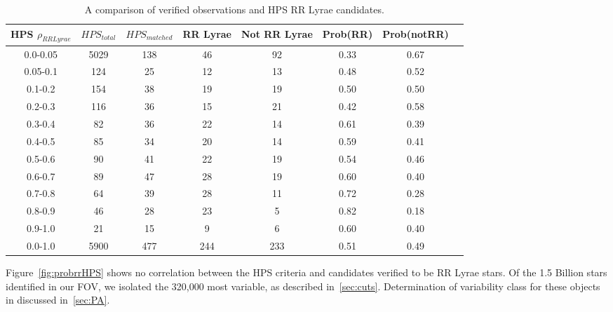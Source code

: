 \documentclass[aps,prb,twocolumn,superscriptaddress]{revtex4-1}
\begin{document}
\begin{table}
	\begin{center}
		\begin{tabular}{|c|c|c|c|c|c|c|c|}\hline
HPS $\rho_{RRLyrae}$ & $HPS_{total}$ & $HPS_{matched}$ & RR Lyrae & Not RR Lyrae & Prob(RR) & Prob(notRR) \\ \hline
0.0-0.05 & 5029 & 138 & 46 		& 92 & 0.33 & 0.67 \\ \hline
0.05-0.1 & 124 & 25 & 12 		& 13 & 0.48 & 0.52 \\ \hline
0.1-0.2 & 154 & 38 & 19 		& 19 & 0.50 & 0.50 \\ \hline
0.2-0.3 & 116 & 36 & 15 		& 21 & 0.42 & 0.58 \\ \hline
0.3-0.4 & 82 & 36 & 22 			& 14 & 0.61 & 0.39 \\ \hline
0.4-0.5 & 85 & 34 & 20			& 14 & 0.59 & 0.41 \\ \hline
0.5-0.6 & 90 & 41 & 22			& 19 & 0.54 & 0.46 \\ \hline
0.6-0.7 & 89 & 47 & 28			& 19 & 0.60 & 0.40 \\ \hline
0.7-0.8 & 64 & 39 & 28 			& 11 & 0.72 & 0.28 \\ \hline
0.8-0.9 & 46 & 28 & 23 			& 5 & 0.82 & 0.18 \\ \hline
0.9-1.0 & 21 & 15 & 9			& 6 & 0.60 & 0.40 \\ \hline
\hline
0.0-1.0 & 5900 & 477 & 244 & 233 & 0.51 & 0.49  \\ \hline
		\end{tabular}
	\end{center}
\caption{ \small{A comparison of verified observations and HPS RR Lyrae candidates. \label{tab:HPSlim15}}}
\end{table}


Figure~\ref{fig:probrrHPS} shows no correlation between the HPS criteria and candidates verified to be RR Lyrae stars.  Of the 1.5 Billion stars identified in our FOV, we isolated the 320,000 most variable, 
as described in~\cref{sec:cuts}.  Determination of variability class for these objects in discussed in~\cref{sec:PA}.
\end{document}
